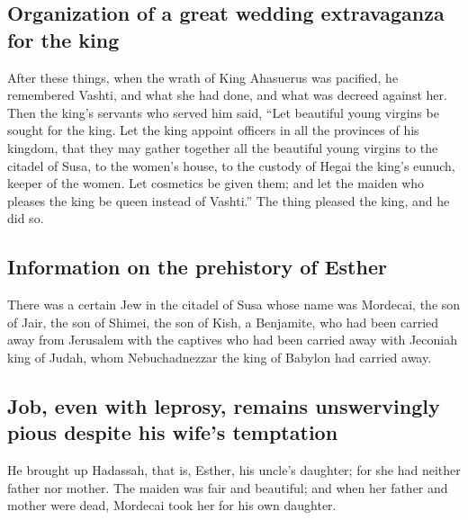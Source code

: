 \hypertarget{organization-of-a-great-wedding-extravaganza-for-the-king}{%
\subsection{Organization of a great wedding extravaganza for the
king}\label{organization-of-a-great-wedding-extravaganza-for-the-king}}

 After these things, when the wrath of King Ahasuerus was
pacified, he remembered Vashti, and what she had done, and what was
decreed against her.  Then the king's servants who served
him said, ``Let beautiful young virgins be sought for the king.
 Let the king appoint officers in all the provinces of his
kingdom, that they may gather together all the beautiful young virgins
to the citadel of Susa, to the women's house, to the custody of Hegai
the king's eunuch, keeper of the women. Let cosmetics be given them;
 and let the maiden who pleases the king be queen instead
of Vashti.'' The thing pleased the king, and he did so.

\hypertarget{information-on-the-prehistory-of-esther}{%
\subsection{Information on the prehistory of
Esther}\label{information-on-the-prehistory-of-esther}}

 There was a certain Jew in the citadel of Susa whose name
was Mordecai, the son of Jair, the son of Shimei, the son of Kish, a
Benjamite,  who had been carried away from Jerusalem with
the captives who had been carried away with Jeconiah king of Judah, whom
Nebuchadnezzar the king of Babylon had carried away.

\hypertarget{job-even-with-leprosy-remains-unswervingly-pious-despite-his-wifes-temptation}{%
\subsection{Job, even with leprosy, remains unswervingly pious despite
his wife's
temptation}\label{job-even-with-leprosy-remains-unswervingly-pious-despite-his-wifes-temptation}}

 He brought up Hadassah, that is, Esther, his uncle's
daughter; for she had neither father nor mother. The maiden was fair and
beautiful; and when her father and mother were dead, Mordecai took her
for his own daughter.

